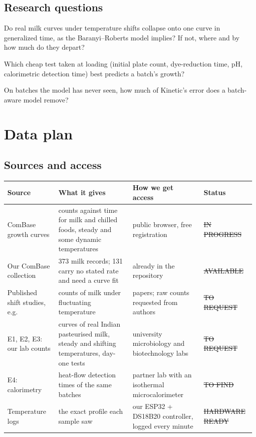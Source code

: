 \subsection*{Research questions}
\begin{description}[leftmargin=2.2em,labelwidth=2em,font=\sffamily\bfseries\color{dgamberdk}]
\item[Q1] Do real milk curves under temperature shifts collapse onto one curve in generalized time, as the Baranyi--Roberts model implies? If not, where and by how much do they depart?
\item[Q2] Which cheap test taken at loading (initial plate count, dye-reduction time, pH, calorimetric detection time) best predicts a batch's growth?
\item[Q3] On batches the model has never seen, how much of Kinetic's error does a batch-aware model remove?
\end{description}

\section{Data plan}\label{sec:data}
\subsection{Sources and access}
\begin{center}\small\begin{tabular}{@{}p{3.3cm}p{4.3cm}p{3.6cm}p{2.3cm}@{}}\toprule\rowcolor{dghead}
Source & What it gives & How we get access & Status\\\midrule
ComBase growth curves \cite{combase} & counts against time for milk and chilled foods, steady and some dynamic temperatures & public browser, free registration & \st{IN PROGRESS}\\
Our ComBase collection & 373 milk records; 131 carry no stated rate and need a curve fit & already in the repository & \st{AVAILABLE}\\
Published shift studies, e.g.\ \cite{lin2016} & counts of milk under fluctuating temperature & papers; raw counts requested from authors & \st{TO REQUEST}\\
E1, E2, E3: our lab counts & curves of real Indian pasteurised milk, steady and shifting temperatures, day-one tests & university microbiology and biotechnology labs & \st{TO REQUEST}\\
E4: calorimetry & heat-flow detection times of the same batches & partner lab with an isothermal microcalorimeter & \st{TO FIND}\\
Temperature logs & the exact profile each sample saw & our ESP32 + DS18B20 controller, logged every minute & \st{HARDWARE READY}\\
\bottomrule\end{tabular}\end{center}

